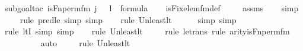 \begin{isabellebody}
%
\isatagproof
{}\isamarkupfalse%
{\isacharparenleft}{\kern0pt}subgoal{\isacharunderscore}{\kern0pt}tac\ {\isachardoublequoteopen}is{\isacharunderscore}{\kern0pt}Fn{\isacharunderscore}{\kern0pt}perm{\isacharprime}{\kern0pt}{\isacharunderscore}{\kern0pt}fm{\isacharparenleft}{\kern0pt}{}{\isacharcomma}{\kern0pt}\ j\ {\isacharhash}{\kern0pt}{\isacharplus}{\kern0pt}\ {}{\isacharcomma}{\kern0pt}\ l{\isacharhash}{\kern0pt}{\isacharplus}{\kern0pt}{}{\isacharparenright}{\kern0pt}\ {\isasymin}\ formula{\isachardoublequoteclose}{\isacharparenright}{\kern0pt}\isanewline
\ \ \isamarkupfalse%
\ is{\isacharunderscore}{\kern0pt}Fix{\isacharunderscore}{\kern0pt}elem{\isacharunderscore}{\kern0pt}fm{\isacharunderscore}{\kern0pt}def\ \isanewline
\ \ \isamarkupfalse%
\ assms\isanewline
\ \ \isamarkupfalse%
\ simp\isanewline
\ \ \ \isamarkupfalse%
{\isacharparenleft}{\kern0pt}rule\ pred{\isacharunderscore}{\kern0pt}le{\isacharcomma}{\kern0pt}\ simp{\isacharcomma}{\kern0pt}\ simp{\isacharparenright}{\kern0pt}\isanewline
\ \ \ \isamarkupfalse%
{\isacharparenleft}{\kern0pt}rule\ Un{\isacharunderscore}{\kern0pt}least{\isacharunderscore}{\kern0pt}lt{\isacharparenright}{\kern0pt}{\isacharplus}{\kern0pt}\isanewline
\ \ \ \ \ \isamarkupfalse%
{\isacharparenleft}{\kern0pt}simp{\isacharcomma}{\kern0pt}\ simp{\isacharparenright}{\kern0pt}\isanewline
\ \ \ \ \isamarkupfalse%
{\isacharparenleft}{\kern0pt}rule\ ltI{\isacharcomma}{\kern0pt}\ simp{\isacharcomma}{\kern0pt}\ simp{\isacharparenright}{\kern0pt}\isanewline
\ \ \ \isamarkupfalse%
{\isacharparenleft}{\kern0pt}rule\ Un{\isacharunderscore}{\kern0pt}least{\isacharunderscore}{\kern0pt}lt{\isacharparenright}{\kern0pt}{\isacharplus}{\kern0pt}\isanewline
\ \ \ \ \isamarkupfalse%
{\isacharparenleft}{\kern0pt}rule\ le{\isacharunderscore}{\kern0pt}trans{\isacharcomma}{\kern0pt}\ rule\ arity{\isacharunderscore}{\kern0pt}is{\isacharunderscore}{\kern0pt}Fn{\isacharunderscore}{\kern0pt}perm{\isacharprime}{\kern0pt}{\isacharunderscore}{\kern0pt}fm{\isacharparenright}{\kern0pt}\isanewline
\ \ \ \ \ \ \ \isamarkupfalse%
\ auto{\isacharbrackleft}{\kern0pt}{}{\isacharbrackright}{\kern0pt}\isanewline
\ \ \ \ \isamarkupfalse%
{\isacharparenleft}{\kern0pt}rule\ Un{\isacharunderscore}{\kern0pt}least{\isacharunderscore}{\kern0pt}lt{\isacharparenright}{\kern0pt}{\isacharplus}{\kern0pt}\isanewline

\end{isabellebody}
